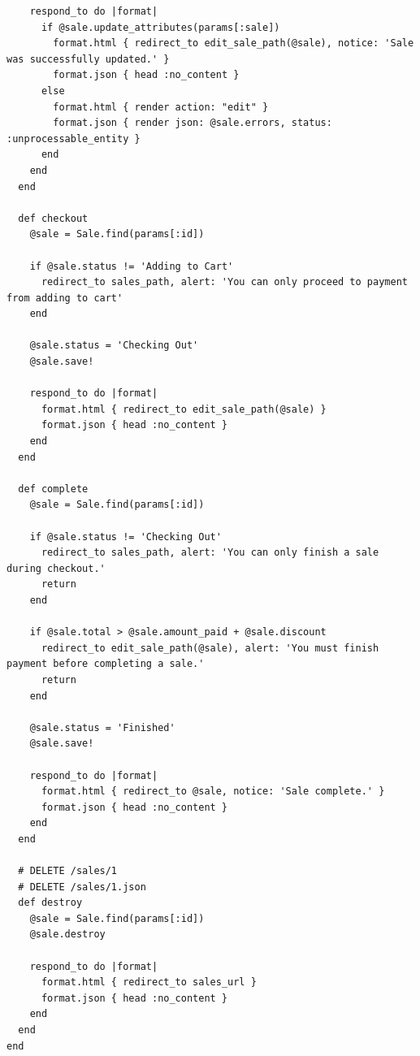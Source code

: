 \documentclass[a4paper]{article}
\begin{document}
\begin{verbatim}
    respond_to do |format|
      if @sale.update_attributes(params[:sale])
        format.html { redirect_to edit_sale_path(@sale), notice: 'Sale was successfully updated.' }
        format.json { head :no_content }
      else
        format.html { render action: "edit" }
        format.json { render json: @sale.errors, status: :unprocessable_entity }
      end
    end
  end

  def checkout
    @sale = Sale.find(params[:id])

    if @sale.status != 'Adding to Cart'
      redirect_to sales_path, alert: 'You can only proceed to payment from adding to cart'
    end

    @sale.status = 'Checking Out'
    @sale.save!

    respond_to do |format|
      format.html { redirect_to edit_sale_path(@sale) }
      format.json { head :no_content }
    end
  end

  def complete
    @sale = Sale.find(params[:id])

    if @sale.status != 'Checking Out'
      redirect_to sales_path, alert: 'You can only finish a sale during checkout.'
      return
    end

    if @sale.total > @sale.amount_paid + @sale.discount
      redirect_to edit_sale_path(@sale), alert: 'You must finish payment before completing a sale.'
      return
    end

    @sale.status = 'Finished'
    @sale.save!

    respond_to do |format|
      format.html { redirect_to @sale, notice: 'Sale complete.' }
      format.json { head :no_content }
    end
  end

  # DELETE /sales/1
  # DELETE /sales/1.json
  def destroy
    @sale = Sale.find(params[:id])
    @sale.destroy

    respond_to do |format|
      format.html { redirect_to sales_url }
      format.json { head :no_content }
    end
  end
end

\end{verbatim}
\end{document}
